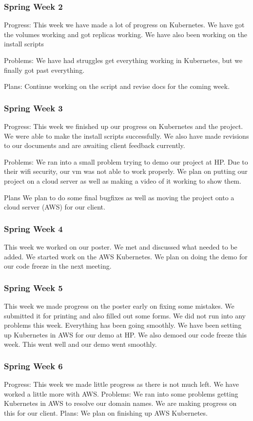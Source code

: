 \documentclass[onecolumn, draftclsnofoot,10pt, compsoc]{IEEEtran}
\begin{document}
\subsubsection*{Spring Week 2}
Progress: This week we have made a lot of progress on Kubernetes. We have got the volumes working and got replicas working. We have also been working on the install scripts

Problems: We have had struggles get everything working in Kubernetes, but we finally got past everything.

Plans: Continue working on the script and revise docs for the coming week.
\subsubsection*{Spring Week 3}
Progress: This week we finished up our progress on Kubernetes and the project. We were able to make the install scripts successfully. We also have made revisions to our documents and are awaiting client feedback currently.

Problems: We ran into a small problem trying to demo our project at HP. Due to their wifi security, our vm was not able to work properly. We plan on putting our project on a cloud server as well as making a video of it working to show them.

Plans We plan to do some final bugfixes as well as moving the project onto a cloud server (AWS) for our client.
\subsubsection*{Spring Week 4}
This week we worked on our poster. We met and discussed what needed to be added. We started work on the AWS Kubernetes. We plan on doing the demo for our code freeze in the next meeting.
\subsubsection*{Spring Week 5}
This week we made progress on the poster early on fixing some mistakes. We submitted it for printing and also filled out some forms. We did not run into any problems this week. Everything has been going smoothly. We have been setting up Kubernetes in AWS for our demo at HP. We also demoed our code freeze this week. This went well and our demo went smoothly.
\subsubsection*{Spring Week 6}
Progress: This week we made little progress as there is not much left. We have worked a little more with AWS. 
Problems: We ran into some problems getting Kubernetes in AWS to resolve our domain names. We are making progress on this for our client.
Plans: We plan on finishing up AWS Kubernetes.
\end{document}
